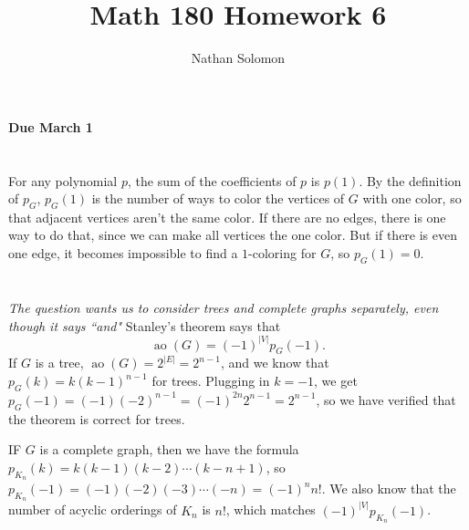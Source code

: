 \documentclass[12pt]{article}
\begin{document}
\title{Math 180 Homework 6}
\author{Nathan Solomon}
\maketitle

\textbf{Due March 1}

\section{}
\noindent{}\bigskip\par

For any polynomial $p$, the sum of the coefficients of $p$ is $p(1)$. By the definition of $p_G$, $p_G(1)$ is the number of ways to color the vertices of $G$ with one color, so that adjacent vertices aren't the same color. If there are no edges, there is one way to do that, since we can make all vertices the one color. But if there is even one edge, it becomes impossible to find a $1$-coloring for $G$, so $p_G(1)=0$.

\section{}
\noindent{}\bigskip\par

\section{}
\noindent{}\bigskip\par

\section{}
\noindent{}\bigskip\par
\textit{The question wants us to consider trees and complete graphs separately, even though it says ``and"}
Stanley's theorem says that
\[ \operatorname{ao}(G)=(-1)^{|V|} p_G(-1). \]
If $G$ is a tree, $ \operatorname{ao}(G)=2^{|E|}=2^{n-1}$, and we know that $p_G(k)=k(k-1)^{n-1}$ for trees. Plugging in $k=-1$, we get $p_G(-1)=(-1)(-2)^{n-1}=(-1)^{2n}2^{n-1}=2^{n-1}$, so we have verified that the theorem is correct for trees.
\par
IF $G$ is a complete graph, then we have the formula $p_{K_n}(k)= k (k-1) (k-2) \cdots (k-n+1)$, so $p_{K_n}(-1)=(-1)(-2)(-3)\cdots(-n)=(-1)^nn!$. We also know that the number of acyclic orderings of $K_n$ is $n!$, which matches $(-1)^{|V|}p_{K_n}(-1)$.
\end{document}
